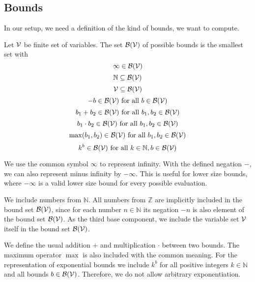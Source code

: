 \subsection{Bounds}

In our setup, we need a definition of the kind of bounds, we want to compute.

\begin{definition}
  Let $\mathcal{V}$ be finite set of variables.
  The set $\mathcal{B}(\mathcal{V})$ of possible bounds is the smallest set with
  \[ \infty \in \mathcal{B}(\mathcal{V}) \]
  \[ \mathbb{N} \subseteq \mathcal{B}(\mathcal{V}) \] 
  \[ \mathcal{V} \subseteq \mathcal{B}(\mathcal{V}) \] 
  \[ -b \in \mathcal{B}(\mathcal{V}) \text{ for all } b \in \mathcal{B}(\mathcal{V}) \] 
  \[ b_1 + b_2 \in \mathcal{B}(\mathcal{V}) \text{ for all } b_1, b_2 \in \mathcal{B}(\mathcal{V}) \] 
  \[ b_1 \cdot b_2 \in \mathcal{B}(\mathcal{V}) \text{ for all } b_1, b_2 \in \mathcal{B}(\mathcal{V}) \] 
  \[ \max(b_1, b_2) \in \mathcal{B}(\mathcal{V}) \text{ for all } b_1, b_2 \in \mathcal{B}(\mathcal{V}) \]
  \[ k^b \in \mathcal{B}(\mathcal{V}) \text{ for all } k \in \mathbb{N}, b \in \mathcal{B}(\mathcal{V}) \]
\end{definition}

We use the common symbol $\infty$ to represent infinity.
With the defined negation $-$, we can also represent minus infinity by $-\infty$.
This is useful for lower size bounds, where $-\infty$ is a valid lower size bound for every possible evaluation.

We include numbers from $\mathbb{N}$.
All numbers from $\mathbb{Z}$ are implicitly included in the bound set $\mathcal{B}(\mathcal{V})$, since for each number $n \in \mathbb{N}$ its negation $-n$ is also element of the bound set $\mathcal{B}(\mathcal{V})$.
As the third base component, we include the variable set $\mathcal{V}$ itself in the bound set $\mathcal{B}(\mathcal{V})$.

We define the usual addition $+$ and multiplication $\cdot$ between two bounds.
The maximum operator $\max$ is also included with the common meaning.
For the representation of exponential bounds we include $k^b$ for all positive integers $k \in \mathbb{N}$ and all bounds $b \in \mathcal{B}(\mathcal{V})$.
Therefore, we do not allow arbitrary exponentiation.

